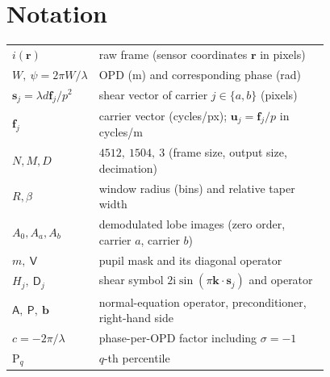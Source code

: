 \documentclass[11pt,a4paper]{article}
\theoremstyle{definition}
\newcommand{\vr}{\bm{r}}
\newcommand{\vk}{\bm{k}}
\newcommand{\vs}{\bm{s}}
\newcommand{\vf}{\bm{f}}
\newcommand{\vu}{\bm{u}}
\newcommand{\ii}{\mathrm{i}}
\newcommand{\Dop}{\mathsf{D}}
\newcommand{\Vop}{\mathsf{V}}
\newcommand{\Aop}{\mathsf{A}}
\newcommand{\Pop}{\mathsf{P}}
\begin{document}
\section{Notation}
\begin{tabular}{@{}lp{0.78\linewidth}@{}}
$i(\vr)$ & raw frame (sensor coordinates $\vr$ in pixels)\\
$W,\ \psi=2\pi W/\lambda$ & OPD (m) and corresponding phase (rad)\\
$\vs_j=\lambda d\vf_j/p^2$ & shear vector of carrier $j\in\{a,b\}$ (pixels)\\
$\vf_j$ & carrier vector (cycles/px); $\vu_j=\vf_j/p$ in cycles/m\\
$N,M,D$ & $4512,\ 1504,\ 3$ (frame size, output size, decimation)\\
$R,\beta$ & window radius (bins) and relative taper width\\
$A_0,A_a,A_b$ & demodulated lobe images (zero order, carrier $a$, carrier $b$)\\
$m,\ \Vop$ & pupil mask and its diagonal operator\\
$H_j,\ \Dop_j$ & shear symbol $2\ii\sin(\pi\vk\cdot\vs_j)$ and operator\\
$\Aop,\ \Pop,\ \bm b$ & normal-equation operator, preconditioner, right-hand side\\
$c=-2\pi/\lambda$ & phase-per-OPD factor including $\sigma=-1$\\
$\mathrm P_q$ & $q$-th percentile\\
\end{tabular}
\end{document}
